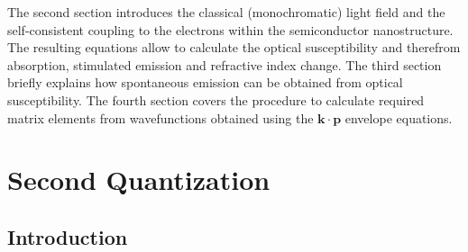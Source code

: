 The second section introduces the classical (monochromatic) light
field and the self-consistent coupling to the electrons within the
semiconductor nanostructure. The resulting equations allow to calculate
the optical susceptibility and therefrom absorption, stimulated emission
and refractive index change. The third section briefly explains how
spontaneous emission can be obtained from optical susceptibility.
The fourth section covers the procedure to calculate required matrix
elements from wavefunctions obtained using the $\mathbf{k}\cdot\mathbf{p}$
envelope equations.


\section{Second Quantization}


\subsection{Introduction}

